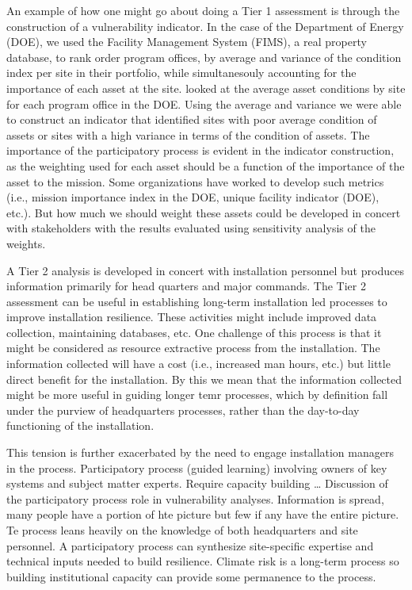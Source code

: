 \documentclass[10pt]{amsart}
\begin{document}
An example of how one might go about doing a Tier 1 assessment is through the construction of a vulnerability indicator.
In the case of the Department of Energy (DOE), we used the Facility Management System (FIMS), a real property database, to rank order program offices, by average and variance of the condition index per site in their portfolio, while simultanesouly accounting for the importance of each asset at the site. looked at the average asset conditions by site for each program office in the DOE. 
Using the average and variance we were able to construct an indicator that identified sites with poor average condition of assets or sites with a high variance in terms of the condition of assets.
The importance of the participatory process is evident in the indicator construction, as the weighting used for each asset should be a function of the importance of the asset to the mission.
Some organizations have worked to develop such metrics (i.e., mission importance index in the DOE, unique facility indicator (DOE), etc.).
But how much we should weight these assets could be developed in concert with stakeholders with the results evaluated using sensitivity analysis of the weights.



A Tier 2 analysis is developed in concert with installation personnel but produces information primarily for head quarters and major commands.
The Tier 2 assessment can be useful in establishing long-term installation led processes to improve installation resilience.
These activities might include improved data collection, maintaining databases, etc.
One challenge of this process is that it might be considered as resource extractive process from the installation.
The information collected will have a cost (i.e., increased man hours, etc.) but little direct benefit for the installation.
By this we mean that the information collected might be more useful in guiding longer temr processes, which by definition fall under the purview of headquarters processes, rather than the day-to-day functioning of the installation. 

This tension is further exacerbated by the need to engage installation managers in the process.
Participatory process (guided learning) involving owners of key systems and subject matter experts.
Require capacity building \ldots
Discussion of the participatory process role in vulnerability analyses.
Information is spread, many people have a portion of hte picture but few if any have the entire picture.
Te process leans heavily on the knowledge of both headquarters and site personnel. 
A participatory process can synthesize site-specific expertise and technical inputs needed to build resilience. 
Climate risk is a long-term process so building institutional capacity can provide some permanence to the process.
\end{document}
